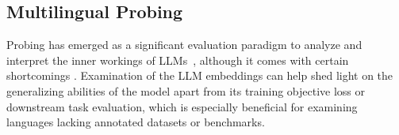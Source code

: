 \documentclass[twoside,11pt]{article}
\begin{document}


\subsection{Multilingual Probing}
\label{sec:eval:probing}
Probing has emerged as a significant evaluation paradigm to analyze and interpret the inner workings of LLMs~\citep{ettinger-etal-2016-probing,adi:2017:ICLR,belinkov-etal-2017-neural,hupkes2018visualisation,tenney2018you,belinkov-glass-2019-analysis,teehan-etal-2022-emergent}, although it comes with certain shortcomings \citep{belinkov-2022-probing}. Examination of the LLM embeddings can help shed light on the generalizing abilities of the model apart from its training objective loss or downstream task evaluation, which is especially beneficial for examining languages lacking annotated datasets or benchmarks.
\end{document}
